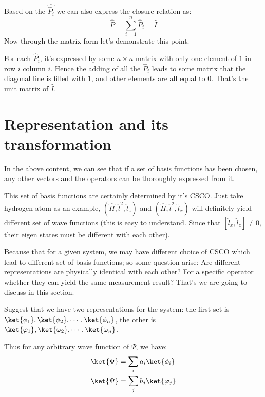 Based on the $\hat{\hat{P}_{i}}$ we can also express the closure
relation as:
\begin{equation}\label{}
\hat{P} = \sum_{i=1}^{n}\hat{P}_{i} = \hat{I}
\end{equation}
Now through the matrix form let's demonstrate this point.

For each $\hat{P}_{i}$, it's expressed by some $n\times n$ matrix
with only one element of $1$ in row $i$ column $i$. Hence the adding
of all the $\hat{P}_{i}$ leads to some matrix that the diagonal line
is filled with $1$, and other elements are all equal to $0$. That's
the unit matrix of $\hat{I}$.

\section{Representation and its transformation}
\label{transformation_in_representation}
%
%
%
In the above content, we can see that if a set of basis functions
has been chosen, any other vectors and the operators can be
thoroughly expressed from it.

This set of basis functions are certainly determined by it's CSCO.
Just take hydrogen atom as an example, $(\hat{H}, \hat{l}^{2},
\hat{l}_{z})$ and $(\hat{H}, \hat{l}^{2}, \hat{l}_{x})$ will
definitely yield different set of wave functions (this is easy to
understand. Since that $[\hat{l}_{x}, \hat{l}_{z}] \neq 0$, their
eigen states must be different with each other).

Because that for a given system, we may have different choice of
CSCO which lead to different set of basis functions; so some
question arise: Are different representations are physically
identical with each other? For a specific operator whether they can
yield the same measurement result? That's we are going to discuss in
this section.

Suggest that we have two representations for the system: the first
set is ${\ket{\phi_{1}}, \ket{\phi_{2}}, \cdots, \ket{\phi_{n}}}$,
the other is ${\ket{\varphi_{1}}, \ket{\varphi_{2}}, \cdots,
\ket{\varphi_{n}}}$.

Thus for any arbitrary wave function of $\Psi$, we have:
\begin{align}\label{}
\ket{\Psi} &= \sum_{i}a_{i}\ket{\phi_{i}} \nonumber \\
\ket{\Psi} &= \sum_{j}b_{j}\ket{\varphi_{j}}
\end{align}

